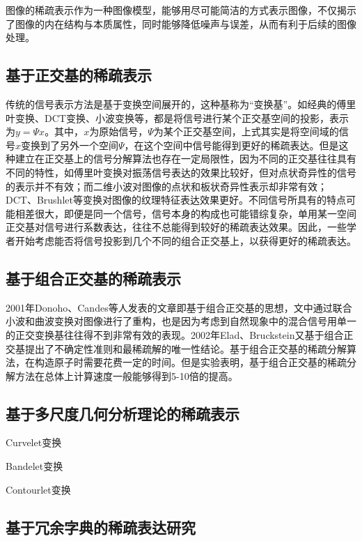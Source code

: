 \documentclass[a4paper,12pt]{article}
\begin{document}
图像的稀疏表示作为一种图像模型，能够用尽可能简洁的方式表示图像，不仅揭示了图像的内在结构与本质属性，同时能够降低噪声与误差，从而有利于后续的图像处理。

\subsection{基于正交基的稀疏表示}

传统的信号表示方法是基于变换空间展开的，这种基称为“变换基”。如经典的傅里叶变换、DCT变换、小波变换等，都是将信号进行某个正交基空间的投影，表示为$y=\Psi x$。其中，$x$为原始信号，$\Psi$为某个正交基空间，上式其实是将空间域的信号$x$变换到了另外一个空间$\Psi$，在这个空间中信号能得到更好的稀疏表达。但是这种建立在正交基上的信号分解算法也存在一定局限性，因为不同的正交基往往具有不同的特性，如傅里叶变换对振荡信号表达的效果比较好，但对点状奇异性的信号的表示并不有效；而二维小波对图像的点状和板状奇异性表示却非常有效；DCT、Brushlet等变换对图像的纹理特征表达效果更好。不同信号所具有的特点可能相差很大，即便是同一个信号，信号本身的构成也可能错综复杂，单用某一空间正交基对信号进行系数表达，往往不总能得到较好的稀疏表达效果。因此，一些学者开始考虑能否将信号投影到几个不同的组合正交基上，以获得更好的稀疏表达。

\subsection{基于组合正交基的稀疏表示}

2001年Donoho、Candes等人发表的文章即基于组合正交基的思想，文中通过联合小波和曲波变换对图像进行了重构，也是因为考虑到自然现象中的混合信号用单一的正交变换基往往得不到非常有效的表现。2002年Elad、Bruckstein又基于组合正交基提出了不确定性准则和最稀疏解的唯一性结论。基于组合正交基的稀疏分解算法，在构造原子时需要花费一定的时间。但是实验表明，基于组合正交基的稀疏分解方法在总体上计算速度一般能够得到5-10倍的提高。

\subsection{基于多尺度几何分析理论的稀疏表示}

Curvelet变换

Bandelet变换

Contourlet变换

\subsection{基于冗余字典的稀疏表达研究}
\end{document}
